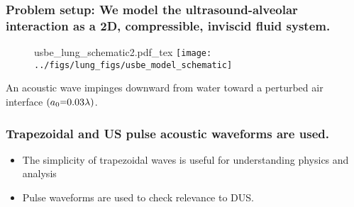 \begin{frame}
\begin{minipage}{\textwidth}
\begin{minipage}{0.5\textwidth}
\begin{figure}
%
      \end{figure}
    \end{minipage}
  \end{minipage}
\end{frame}
\begin{frame} \frametitle{Problem setup: We model the ultrasound-alveolar interaction as a 2D, compressible, inviscid fluid system.}
  \begin{figure}
    \centering
    \def\svgwidth{0.48\textwidth}
    {\footnotesize
      {usbe_lung_schematic2.pdf_tex} \hfill%
    }
    \texttt{[image: ../figs/lung\_figs/usbe\_model\_schematic]} \hfill
  \end{figure}
  An acoustic wave impinges downward from water toward a perturbed air interface $(a_0\equals0.03\lambda)$.
\end{frame}
\begin{frame} \frametitle{Trapezoidal and US pulse acoustic waveforms are used.}
  \begin{figure}
    \centering
    \hfill%
  \end{figure}
  \begin{itemize}
  \item The simplicity of trapezoidal waves is useful for understanding physics and analysis
  \item Pulse waveforms are used to check relevance to DUS.
  \end{itemize}
\end{frame}
